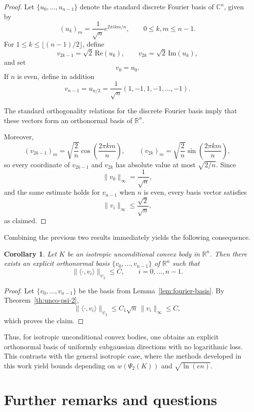 \documentclass[10pt,a4paper]{amsart}
\newtheorem{corollary}[theorem]{Corollary}
\numberwithin{equation}{section}
\newcommand{\ls}{\leqslant}
\begin{document}
\begin{proof}
Let $\{u_0,\ldots,u_{n-1}\}$ denote the standard discrete Fourier basis of $\mathbb{C}^n$, given by
\[(u_k)_m=\frac1{\sqrt n}e^{2\pi i km/n},\qquad 0\ls k,m\ls n-1.\]
For $1\ls k\ls\lfloor(n-1)/2\rfloor$, define
\[v_{2k-1}=\sqrt2\,\mathrm{Re}(u_k),\qquad v_{2k}=\sqrt2\,\mathrm{Im}(u_k),\]
and set
\[v_0=u_0.\]
If $n$ is even, define in addition
\[v_{n-1}=u_{n/2}=\frac1{\sqrt n}(1,-1,1,-1,\ldots,-1).\]

The standard orthogonality relations for the discrete Fourier basis imply that these vectors form an orthonormal basis of $\mathbb{R}^n$.

Moreover,
\[(v_{2k-1})_m=\sqrt{\frac2n}\cos\!\left(\frac{2\pi km}{n}\right),\qquad (v_{2k})_m=\sqrt{\frac2n}\sin\!\left(\frac{2\pi km}{n}\right),\]
so every coordinate of $v_{2k-1}$ and $v_{2k}$ has absolute value at most $\sqrt{2/n}$. Since
\[\|v_0\|_\infty=\frac1{\sqrt n},\]
and the same estimate holds for $v_{n-1}$ when $n$ is even, every basis vector satisfies
\[\|v_i\|_\infty\ls\frac{\sqrt2}{\sqrt n},\]
as claimed.
\end{proof}

Combining the previous two results immediately yields the following consequence.

\begin{corollary}
Let $K$ be an isotropic unconditional convex body in $\mathbb{R}^n$. Then there exists an explicit orthonormal basis
$\{v_0,\ldots,v_{n-1}\}$ of $\mathbb{R}^n$ such that
\[\|\langle\cdot,v_i\rangle\|_{\psi_2}\ls C,\qquad i=0,\ldots,n-1.\]
\end{corollary}

\begin{proof}
Let $\{v_0,\ldots,v_{n-1}\}$ be the basis from Lemma~\ref{lem:fourier-basis}. By Theorem~\ref{th:unco-psi-2},
\[\|\langle\cdot,v_i\rangle\|_{\psi_2}\ls C_1\sqrt n\,\|v_i\|_\infty\ls C,\]
which proves the claim.
\end{proof}

Thus, for isotropic unconditional convex bodies, one obtains an explicit orthonormal basis of uniformly subgaussian directions with no logarithmic loss. This contrasts with the general isotropic case, where the methods developed in this work yield bounds depending on $w(\Psi_2(K))$ and $\sqrt{\ln(en)}$.

\section{Further remarks and questions}\label{section:4}
\end{document}
